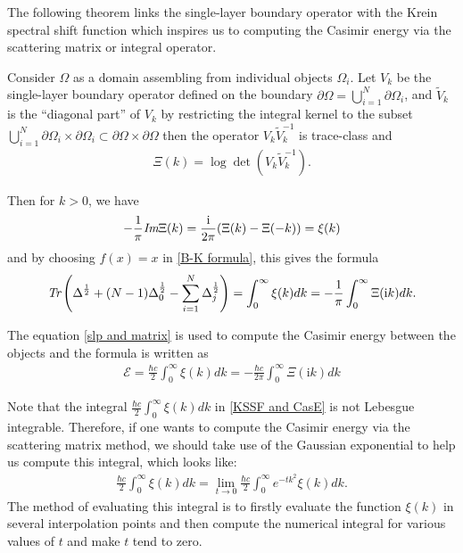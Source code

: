 The following theorem links the single-layer boundary operator with the Krein spectral shift function which inspires us to computing the Casimir energy 
via the scattering matrix or integral operator. 
\begin{theorem}\cite{hanisch2020relative}
    Consider $\Omega$ as a domain assembling from individual objects $\Omega_{i}$. Let $V_{k}$ be the single-layer boundary operator defined on the boundary 
    $\partial\Omega = \bigcup_{i = 1}^{N}\partial\Omega_{i}$, and $\tilde{V}_{k}$ is the ``diagonal part'' of $V_{k}$ by restricting the integral 
    kernel to the subset $\bigcup_{i = 1}^{N}\partial\Omega_{i}\times\partial\Omega_{i}\subset\partial\Omega\times\partial\Omega$ then the operator 
    $V_{k}\tilde{V}_{k}^{-1}$ is trace-class and 
    \begin{align*}
        \Xi(k) = \log\det\left(V_{k}\tilde{V}_{k}^{-1}\right).
    \end{align*}

    Then for $k >0$, we have 
    \begin{align*}
        -\frac{1}{\pi}\emph{\text{Im}}\Xi(k) = \frac{\mathrm{i}}{2\pi}(\Xi(k) - \Xi(-k)) = \xi(k)
    \end{align*}
    and by choosing $f(x) = x$ in \eqref{B-K formula}, this gives the formula 
    \begin{align}\label{slp and matrix}
        \emph{\text{Tr}}\left(\Delta^{\frac{1}{2}} + (N - 1)\Delta_{0}^{\frac{1}{2}} - \sum_{i = 1}^{N}\Delta_{j}^{\frac{1}{2}}\right)  = 
        \int_{0}^{\infty}\xi(k)dk = -\frac{1}{\pi}\int_{0}^{\infty}\Xi(\mathrm{i}k)dk.
    \end{align}
\end{theorem}

The equation \eqref{slp and matrix} is used to compute the Casimir energy between the objects and the formula is written as
\begin{align}\label{KSSF and CasE}
    \mathcal{E} = \frac{\hbar c}{2}\int_{0}^{\infty}\xi(k)dk = -\frac{\hbar c}{2\pi}\int_{0}^{\infty}\Xi(\mathrm{i}k)dk
\end{align}

\begin{remark}
    Note that the integral $\frac{\hbar c}{2}\int_{0}^{\infty}\xi(k)dk$ in \eqref{KSSF and CasE} is not Lebesgue integrable. Therefore, if one wants to compute the
    Casimir energy via the scattering matrix method, we should take use of the Gaussian exponential to help us compute this integral, which looks like:
\begin{align}\label{new SSF}
    \frac{\hbar c}{2}\int_{0}^{\infty}\xi(k)dk = \lim_{t\rightarrow 0}\frac{\hbar c}{2}\int_{0}^{\infty}e^{-tk^2}\xi(k)dk.
\end{align}
The method of evaluating this integral is to firstly evaluate the function $\xi(k)$ in several interpolation points and then compute the numerical 
integral for various values of $t$ and make $t$ tend to zero.
\end{remark}
